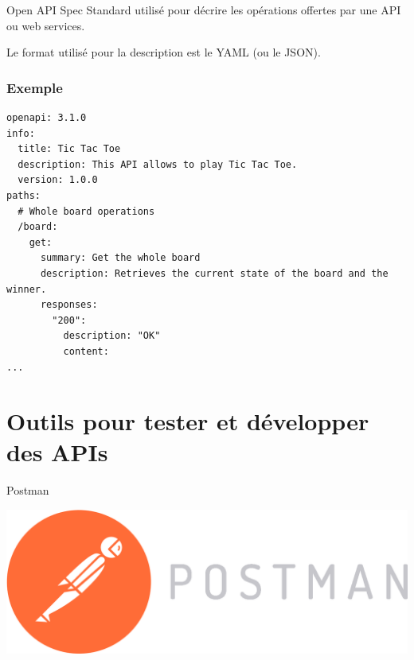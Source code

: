 \documentclass{beamer}
\begin{document}
\begin{frame}{Open API Spec}
Standard utilisé pour décrire les opérations offertes par une API ou web services.

Le format utilisé pour la description est le YAML (ou le JSON).
\end{frame}

\begin{frame}[fragile]
\frametitle{Exemple}
\begin{Verbatim}[fontsize=\scriptsize]
openapi: 3.1.0
info:
  title: Tic Tac Toe
  description: This API allows to play Tic Tac Toe.
  version: 1.0.0
paths:
  # Whole board operations
  /board:
    get:
      summary: Get the whole board
      description: Retrieves the current state of the board and the winner.
      responses:
        "200":
          description: "OK"
          content:
...
\end{Verbatim}  
\end{frame}

\section{Outils pour tester et développer des APIs}
\begin{frame}{Postman}
\begin{center}
  \includegraphics[scale=0.2]{images/postman-logo.png}
\end{center}
\end{frame}
\end{document}
